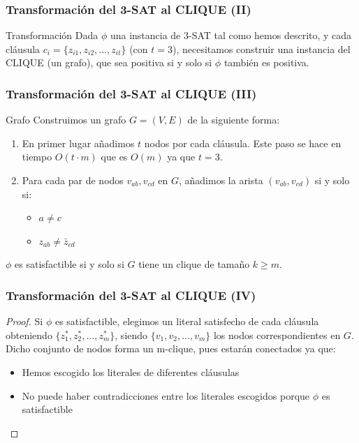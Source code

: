 \documentclass{beamer}
\begin{document}
\begin{frame}
\frametitle{Transformación del 3-SAT al CLIQUE (II)}
    \begin{block}{Transformación}
    Dada $\phi$ una instancia de 3-SAT tal como hemos descrito, y cada cláusula $c_{i} = \{z_{i1}, z_{i2}, ..., z_{it}\}$ (con $t = 3$), necesitamos construir una instancia del CLIQUE (un grafo), que sea positiva si y solo si $\phi$ también es positiva.
    \end{block}
\end{frame}



\begin{frame}
\frametitle{Transformación del 3-SAT al CLIQUE (III)}
    \begin{block}{Grafo}
    Construimos un grafo $G = (V,E)$ de la siguiente forma:
    \begin{enumerate}
        \item En primer lugar añadimos $t$ nodos por cada cláusula. Este paso se hace en tiempo $O(t \cdot m)$ que es $O(m)$ ya que $t = 3$.
        \item Para cada par de nodos $v_{ab},v_{cd}$ en $G$, añadimos la arista $(v_{ab},v_{cd})$ si y solo si:
        \begin{itemize}
            \item $a \neq c$
            \item $z_{ab} \neq \bar{z}_{cd}$
        \end{itemize}
    \end{enumerate}
    \end{block}
    
    $\phi$ es satisfactible si y solo si $G$ tiene un clique de tamaño $k \geq m$.
    
\end{frame}


\begin{frame}
\frametitle{Transformación del 3-SAT al CLIQUE (IV)}
    \begin{proof}
    Si $\phi$ es satisfactible, elegimos un literal satisfecho de cada cláusula obteniendo $\{z_{1}^{*}, z_{2}^{*}, ..., z_{m}^{*}\}$, siendo $\{v_{1}, v_{2}, ..., v_{m}\}$ los nodos correspondientes en $G$. Dicho conjunto de nodos forma un m-clique, pues estarán conectados ya que:
    \begin{itemize}
        \item Hemos escogido los literales de diferentes cláusulas
        \item No puede haber contradicciones entre los literales escogidos porque $\phi$ es satisfactible
    \end{itemize}
    \end{proof}
\end{frame}
\end{document}
